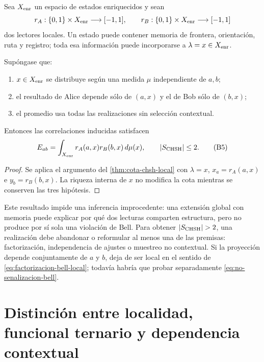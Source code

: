 Sea \(X_{\rm enr}\) un espacio de estados enriquecidos y sean
\[
 r_A:\{0,1\}\times X_{\rm enr}\longrightarrow[-1,1],
 \qquad
 r_B:\{0,1\}\times X_{\rm enr}\longrightarrow[-1,1]
\]
dos lectores locales. Un estado puede contener memoria de frontera,
orientación, ruta y registro; toda esa información puede incorporarse a
\(\lambda=x\in X_{\rm enr}\).

\begin{theorem}
\label{thm:no-promocion-bell-por-proyeccion}
Supóngase que:

\begin{enumerate}
\item \(x\in X_{\rm enr}\) se distribuye según una medida \(\mu\)
independiente de \(a,b\);
\item el resultado de Alice depende sólo de \((a,x)\) y el de Bob sólo de
\((b,x)\);
\item el promedio usa todas las realizaciones sin selección contextual.
\end{enumerate}

Entonces las correlaciones inducidas satisfacen
\[
 E_{ab}=\int_{X_{\rm enr}}r_A(a,x)r_B(b,x)\,d\mu(x),
\qquad
 |S_{\rm CHSH}|\leq2.
 \tag{B5}\label{eq:no-go-proyeccion-local}
\]
\end{theorem}

\begin{proof}
Se aplica el argumento del \cref{thm:cota-chsh-local} con
\(\lambda=x\), \(x_a=r_A(a,x)\) e \(y_b=r_B(b,x)\). La riqueza interna de
\(x\) no modifica la cota mientras se conserven las tres hipótesis.
\end{proof}

Este resultado impide una inferencia improcedente: una extensión global con
memoria puede explicar por qué dos lecturas comparten estructura, pero no
produce por sí sola una violación de Bell. Para obtener
\(|S_{\rm CHSH}|>2\), una realización debe abandonar o reformular al menos una
de las premisas: factorización, independencia de ajustes o muestreo no
contextual. Si la proyección depende conjuntamente de \(a\) y \(b\), deja de
ser local en el sentido de \eqref{eq:factorizacion-bell-local}; todavía habría
que probar separadamente \eqref{eq:no-senalizacion-bell}.

\section{Distinción entre localidad, funcional ternario y dependencia contextual}
\label{sec:cotejo-bell-historico}


